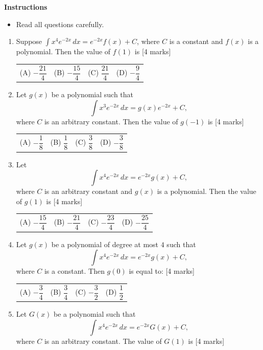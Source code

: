 \documentclass[11pt,a4paper]{article}
\begin{document}
\textbf{Instructions}
\begin{itemize}[topsep=2pt]
\item Read all questions carefully.
\end{itemize}
\begin{enumerate}[resume]
\item Suppose \(\displaystyle \int x^{4}e^{-2x}\,dx=e^{-2x}f(x)+C\), where \(C\) is a constant and \(f(x)\) is a polynomial. Then the value of \(f(1)\) is \hfill [4 marks]
{\renewcommand{\arraystretch}{1.8}
\begin{tabularx}{\linewidth}{X X X X}
(A) \quad \(-\dfrac{21}{4}\) & (B) \quad \(-\dfrac{15}{4}\) & (C) \quad \(\dfrac{21}{4}\) & (D) \quad \(-\dfrac{9}{4}\) \\[10pt]
\end{tabularx}}
\item Let $g(x)$ be a polynomial such that
\[
\int x^3e^{-2x}\,dx=g(x)e^{-2x}+C,
\]
where $C$ is an arbitrary constant. Then the value of $g(-1)$ is \hfill [4 marks]
{\renewcommand{\arraystretch}{1.8}
\begin{tabularx}{\linewidth}{X X X X}
(A) \quad $-\dfrac{1}{8}$ & (B) \quad $\dfrac{1}{8}$ & (C) \quad $\dfrac{3}{8}$ & (D) \quad $-\dfrac{3}{8}$ \\[10pt]
\end{tabularx}}
\item Let
\[
\int x^{4}e^{-2x}\,dx=e^{-2x}g(x)+C,
\]
where \(C\) is an arbitrary constant and \(g(x)\) is a polynomial. Then the value of \(g(1)\) is \hfill [4 marks]
{\renewcommand{\arraystretch}{1.8}
\begin{tabularx}{\linewidth}{X X X X}
(A) \quad \(-\dfrac{15}{4}\) & (B) \quad \(-\dfrac{21}{4}\) & (C) \quad \(-\dfrac{23}{4}\) & (D) \quad \(-\dfrac{25}{4}\) \\[10pt]
\end{tabularx}}
\item Let \(g(x)\) be a polynomial of degree at most \(4\) such that
\[
\int x^4e^{-2x}\,dx=e^{-2x}g(x)+C,
\]
where \(C\) is a constant. Then \(g(0)\) is equal to: \hfill [4 marks]
{\renewcommand{\arraystretch}{1.8}
\begin{tabularx}{\linewidth}{X X X X}
(A) \quad \(-\dfrac{3}{4}\) & (B) \quad \(\dfrac{3}{4}\) & (C) \quad \(-\dfrac{3}{2}\) & (D) \quad \(\dfrac{1}{2}\) \\[10pt]
\end{tabularx}}
\item Let \(G(x)\) be a polynomial such that
\[
\int x^4 e^{-2x}\,dx=e^{-2x}G(x)+C,
\]
where \(C\) is an arbitrary constant. The value of \(G(1)\) is \hfill [4 marks]

\end{enumerate}
\end{document}
